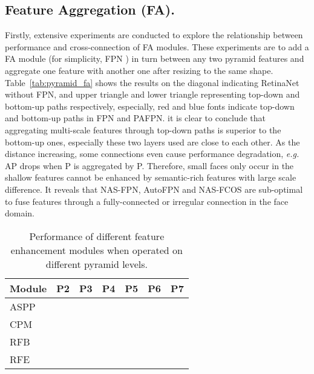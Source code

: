 \documentclass[sigconf]{acmart}
\begin{document}
\subsection{Feature Aggregation (FA).}
Firstly, extensive experiments are conducted to explore the relationship between performance and cross-connection of FA modules. These experiments are to add a FA module (for simplicity, FPN \cite{lin2017fpn}) in turn between any two pyramid features and aggregate one feature with another one after resizing to the same shape. Table~\ref{tab:pyramid_fa} shows the results on the diagonal indicating RetinaNet without FPN, and upper triangle and lower triangle representing top-down and bottom-up paths respectively, especially, red and blue fonts indicate top-down and bottom-up paths in FPN and PAFPN. it is clear to conclude that aggregating multi-scale features through top-down paths is superior to the bottom-up ones, especially these two layers used are close to each other. As the distance increasing, some connections even cause performance degradation, \textit{e.g.} AP drops  when P is aggregated by P.
Therefore, small faces only occur in the shallow features cannot be enhanced by semantic-rich features with large scale difference.
It reveals that NAS-FPN, AutoFPN and NAS-FCOS are sub-optimal to fuse features through a fully-connected or irregular connection in the face domain. 


 
\begin{table}[!t]
    \centering
    \begin{tabular}{l|cccccc}
        \toprule[1pt]
        Module & P2 & P3 & P4 & P5 & P6 & P7 \\
        \midrule[0.5pt]
        ASPP &  &  &  &  &  &  \\
        CPM &  &  &  &  &  &  \\
        RFB &  &  &  &  &  &  \\
        RFE &  &  &  &  &  &  \\
        \bottomrule[1pt]
    \end{tabular}
\caption{Performance of different feature enhancement modules when operated on different pyramid levels.}
    \label{tab:pyramid_fe}
\end{table}
\end{document}
